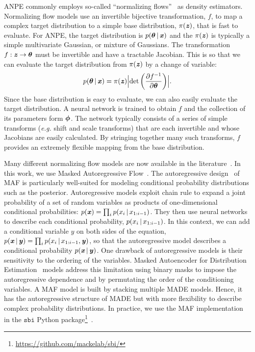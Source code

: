 ANPE commonly employs so-called ``normalizing flows''~\citep{tabak2010,
tabak2013} as density estimators.
Normalizing flow models use an invertible bijective transformation, $f$, to map
a complex target distribution to a simple base distribution, $\pi(\textbf{\textit{z}})$, that is
fast to evaluate.
For ANPE, the target distribution is $p(\boldsymbol{\theta} \,|\, \textbf{\textit{x}})$ and the
$\pi(\textbf{\textit{z}})$ is typically a simple multivariate Gaussian, or mixture of Gaussians.
The transformation $f: \textbf{\textit{z}} \rightarrow \boldsymbol{\theta}$ must be invertible and have a
tractable Jacobian. 
This is so that we can evaluate the target distribution from $\pi(\textbf{\textit{z}})$ by
a change of variable:  
\begin{equation} \label{eq:normflow}
    p(\btheta \given \bfi{x}) = \pi(\bfi{z}) \Bigl|{\rm det} \left(\frac{\partial
    f^{-1}}{\partial \btheta} \right)\Bigr|.
\end{equation} 
Since the base distribution is easy to evaluate, we can also easily evaluate
the target distribution.  
A neural network is trained to obtain $f$ and the collection of its parameters
form $\boldsymbol{\phi}$.
The network typically consists of a series of simple transforms (\emph{e.g.}
shift and scale transforms) that are each invertible and whose Jacobians are
easily calculated. 
By stringing together many such transforms, $f$ provides an extremely flexible
mapping from the base distribution.

Many different normalizing flow models are now available in the
literature~\citep[\emph{e.g.}][]{germain2015, durkan2019}.
In this work, we use Masked Autoregressive
Flow~\citep[MAF;][]{papamakarios2017}. 
The autoregressive design~\citep{uria2016} of MAF is particularly well-suited
for modeling conditional probability distributions such as the posterior. 
Autoregressive models exploit chain rule to expand a joint probability of a set
of random variables as products of one-dimensional conditional
probabilities: $p(\textbf{\textit{x}}) = \prod_i p(x_i\,|\, x_{1:i-1})$. 
They then use neural networks to describe each conditional probability,
$p(x_i\,|\, x_{1:i-1})$. 
In this context, we can add a conditional variable $y$ on both sides of the
equation, $p(\textbf{\textit{x}}\,|\, \textbf{\textit{y}}) = \prod_i p(x_i\,|\, x_{1:i-1}, \textbf{\textit{y}})$, so that the
autoregressive model describes a conditional probability $p(\textbf{\textit{x}}\,|\, \textbf{\textit{y}})$. 
One drawback of autoregressive models is their sensitivity to the ordering of
the variables. 
Masked Autoencoder for Distribution Estimation~\citep[MADE;][]{germain2015}
models address this limitation using binary masks to impose the autoregressive
dependence and by permutating the order of the conditioning variables.
A MAF model is built by stacking multiple MADE models.  
Hence, it has the autoregressive structure of MADE but with more flexibility to
describe complex probability distributions.  
In practice, we use the MAF implementation in the $\mathtt{sbi}$ Python
package\footnote{\url{https://github.com/mackelab/sbi/}}~\citep{greenberg2019,
tejero-cantero2020}.

